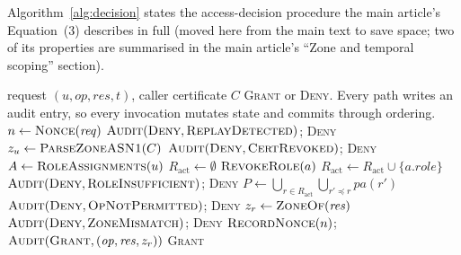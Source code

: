 \begin{widefig}
\caption{Access control within the Fabric execute-order-validate transaction flow.}
\label{fig:flow}
\end{widefig}

Algorithm~\ref{alg:decision} states the access-decision procedure the main
article's Equation~(3) describes in full (moved here from the main text
to save space; two of its properties are summarised in the main article's
``Zone and temporal scoping'' section).

\begin{widealg}
\caption{Access decision (\texttt{CheckAccess})}
\label{alg:decision}
\small
\begin{algorithmic}[1]
\Require request $(u, \mathit{op}, \mathit{res}, t)$, caller certificate $C$
\Ensure \textsc{Grant} or \textsc{Deny}. Every path writes an audit entry,
  so every invocation mutates state and commits through ordering.
\State $n \gets \textsc{Nonce}(\mathit{req})$
  \State $\textsc{Audit}(\textsc{Deny}, \textsc{ReplayDetected})$;\;
         \Return \textsc{Deny}
\EndIf
\State $z_u \gets \textsc{ParseZoneASN1}(C)$
  \State $\textsc{Audit}(\textsc{Deny}, \textsc{CertRevoked})$;\;
         \Return \textsc{Deny}
\EndIf
\State $A \gets \textsc{RoleAssignments}(u)$
\State $R_{\text{act}} \gets \emptyset$
    \State $\textsc{RevokeRole}(a)$
  \Else
    \State $R_{\text{act}} \gets R_{\text{act}} \cup \{a.\mathit{role}\}$
  \EndIf
\EndFor
{}
  \State $\textsc{Audit}(\textsc{Deny}, \textsc{RoleInsufficient})$;\;
         \Return \textsc{Deny}
\EndIf
\State $P \gets \bigcup_{r \in R_{\text{act}}}
        \bigcup_{r' \preceq r} pa(r')$
  \State $\textsc{Audit}(\textsc{Deny}, \textsc{OpNotPermitted})$;\;
         \Return \textsc{Deny}
\EndIf
\State $z_r \gets \textsc{ZoneOf}(\mathit{res})$
  \State $\textsc{Audit}(\textsc{Deny}, \textsc{ZoneMismatch})$;\;
         \Return \textsc{Deny}
\EndIf
\State $\textsc{RecordNonce}(n)$;\;
       $\textsc{Audit}(\textsc{Grant}, (\mathit{op}, \mathit{res}, z_r))$
\State \Return \textsc{Grant}
\end{algorithmic}
\end{widealg}

